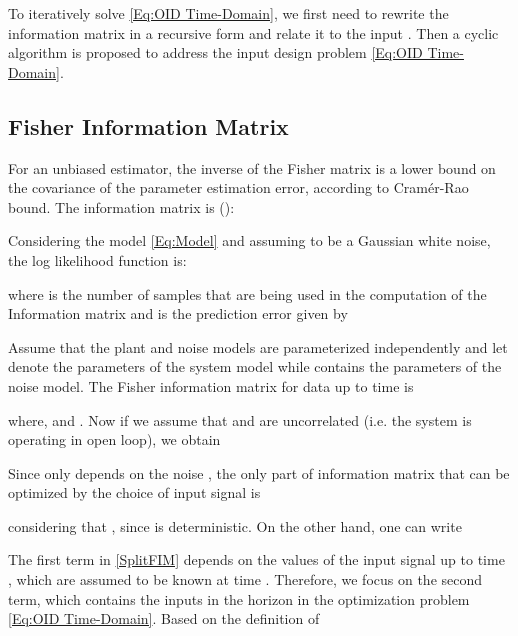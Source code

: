 \documentclass{ifacconf}
\begin{document}
To iteratively solve \eqref{Eq:OID Time-Domain}, we first need to rewrite the information matrix  in a recursive form and relate it to the input . Then a cyclic algorithm is proposed to address the input design problem \eqref{Eq:OID Time-Domain}.
 \vspace{-0.05cm}
\subsection{Fisher Information Matrix}
\label{Sec:Fisher Information Matrix}
For an unbiased estimator, the inverse of the Fisher matrix is a lower bound on the covariance of the parameter estimation error, according to Cram\'{e}r-Rao bound. The information matrix is (\cite{Goodwin&Payne:77}):

Considering the model \eqref{Eq:Model} and assuming  to be a Gaussian white noise, the log likelihood function is:
\vspace{-0.0cm}

\vspace{-0.0cm}
where  is the number of samples that are being used in the computation of the Information matrix and  is the prediction error given by

Assume that the plant and noise models are parameterized independently and let  denote the parameters of the system model while  contains the parameters of the noise model. The Fisher information matrix for data up to time  is

where,  and . Now if we assume that  and  are uncorrelated (i.e. the system is operating in open loop), we obtain
\vspace{-0.2cm}

Since  only depends on the noise , the only part of information matrix that can be optimized by the choice of input signal is
\vspace{-0.05cm}

considering that , since  is deterministic. On the other hand, one can write
\vspace{-0.0cm}

\vspace{-0.0cm}
The first term in \eqref{SplitFIM} depends on the values of the input signal up to time , which are assumed to be known at time . Therefore, we focus on the second term, which contains the inputs in the horizon in the optimization problem \eqref{Eq:OID Time-Domain}.
 Based on the definition of 
\end{document}
